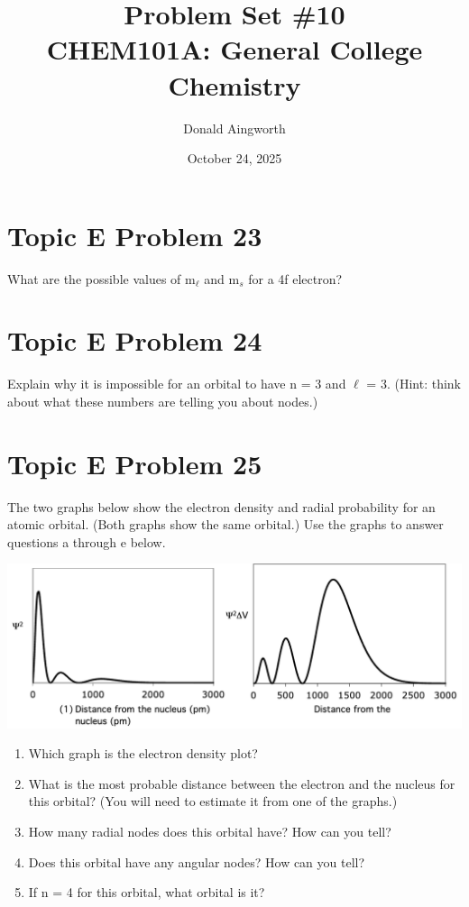 \documentclass[10pt]{article}
\title{
    Problem Set \#10
    \\  \small
    CHEM101A: General College Chemistry
    }
\author{Donald Aingworth}
\date{October 24, 2025}
\begin{document}

    \maketitle

    \setcounter{section}{9}

    \pagebreak
    \section{Topic E Problem 23}
        What are the possible values of m$_\ell$ and m$_s$ for a 4f electron?

    \pagebreak
    \section{Topic E Problem 24}
        Explain why it is impossible for an orbital to have n = 3 and $\ell$ = 3. 
        (Hint: think about what these numbers are telling you about nodes.)

    \pagebreak
    \section{Topic E Problem 25}
        The two graphs below show the electron density and radial probability for an atomic orbital.
        (Both graphs show the same orbital.) 
        Use the graphs to answer questions a through e below.
        \begin{center}
            \includegraphics[width=\textwidth]{img-E25.png}
        \end{center}

        \begin{enumerate}[label=\alph*)]
            \item   Which graph is the electron density plot?
            \item   What is the most probable distance between the electron and the nucleus for this orbital? (You will need to estimate it from one of the graphs.)
            \item   How many radial nodes does this orbital have? How can you tell?
            \item   Does this orbital have any angular nodes? How can you tell?
            \item   If n = 4 for this orbital, what orbital is it?
        \end{enumerate}
\end{document}
